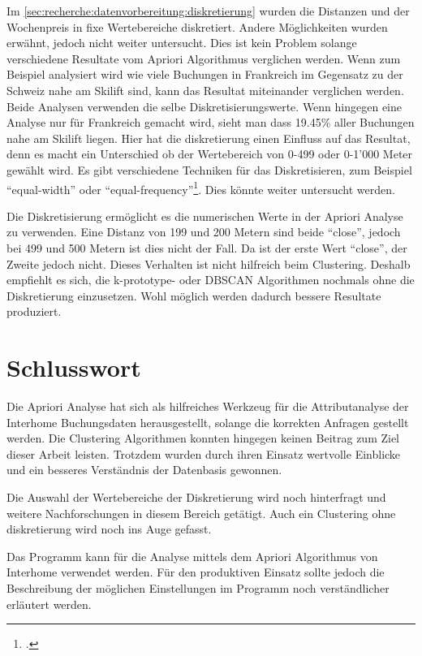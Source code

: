 Im \cref{sec:recherche:datenvorbereitung:diskretierung} wurden die Distanzen und der Wochenpreis in fixe Wertebereiche diskretiert. Andere Möglichkeiten wurden erwähnt, jedoch nicht weiter untersucht. Dies ist kein Problem solange verschiedene Resultate vom Apriori Algorithmus verglichen werden. Wenn zum Beispiel analysiert wird wie viele Buchungen in Frankreich im Gegensatz zu der Schweiz nahe am Skilift sind, kann das Resultat miteinander verglichen werden. Beide Analysen verwenden die selbe Diskretisierungswerte. Wenn hingegen eine Analyse nur für Frankreich gemacht wird, sieht man dass 19.45\% aller Buchungen nahe am Skilift liegen. Hier hat die diskretierung einen Einfluss auf das Resultat, denn es macht ein Unterschied ob der Wertebereich von 0-499 oder 0-1'000 Meter gewählt wird. Es gibt verschiedene Techniken für das Diskretisieren, zum Beispiel "`equal-width"' oder "`equal-frequency"'\footcite{data_mining_concepts_and_techniques}. Dies könnte weiter untersucht werden.

Die Diskretisierung ermöglicht es die numerischen Werte in der Apriori Analyse zu verwenden. Eine Distanz von 199 und 200 Metern sind beide "`close"', jedoch bei 499 und 500 Metern ist dies nicht der Fall. Da ist der erste Wert "`close"', der Zweite jedoch nicht. Dieses Verhalten ist nicht hilfreich beim Clustering. Deshalb empfiehlt es sich, die k-prototype- oder DBSCAN Algorithmen nochmals ohne die Diskretierung einzusetzen. Wohl möglich werden dadurch bessere Resultate produziert. 

%
%
%
%

\section{Schlusswort}
Die Apriori Analyse hat sich als hilfreiches Werkzeug für die Attributanalyse der Interhome Buchungsdaten herausgestellt, solange die korrekten Anfragen gestellt werden. Die Clustering Algorithmen konnten hingegen keinen Beitrag zum Ziel dieser Arbeit leisten. Trotzdem wurden durch ihren Einsatz wertvolle Einblicke und ein besseres Verständnis der Datenbasis gewonnen.

Die Auswahl der Wertebereiche der Diskretierung wird noch hinterfragt und weitere Nachforschungen in diesem Bereich getätigt. Auch ein Clustering ohne diskretierung wird noch ins Auge gefasst.

Das Programm kann für die Analyse mittels dem Apriori Algorithmus von Interhome verwendet werden. Für den produktiven Einsatz sollte jedoch die Beschreibung der möglichen Einstellungen im Programm noch verständlicher erläutert werden. 